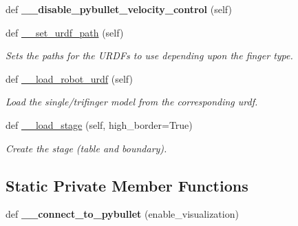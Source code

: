 \begin{DoxyCompactItemize}
def {\bfseries \+\_\+\+\_\+disable\+\_\+pybullet\+\_\+velocity\+\_\+control} (self)
\item 
\mbox{\label{classtrifinger__simulation_1_1sim__finger_1_1SimFinger_abc4c06d8b54077f9494ae9fd78014bee}} 
def \hyperlink{classtrifinger__simulation_1_1sim__finger_1_1SimFinger_abc4c06d8b54077f9494ae9fd78014bee}{\+\_\+\+\_\+set\+\_\+urdf\+\_\+path} (self)
\begin{DoxyCompactList}\small\item\em Sets the paths for the U\+R\+D\+Fs to use depending upon the finger type. \end{DoxyCompactList}\item 
\mbox{\label{classtrifinger__simulation_1_1sim__finger_1_1SimFinger_afb59a872dc92feaad5d292e69af4efd5}} 
def \hyperlink{classtrifinger__simulation_1_1sim__finger_1_1SimFinger_afb59a872dc92feaad5d292e69af4efd5}{\+\_\+\+\_\+load\+\_\+robot\+\_\+urdf} (self)
\begin{DoxyCompactList}\small\item\em Load the single/trifinger model from the corresponding urdf. \end{DoxyCompactList}\item 
def \hyperlink{classtrifinger__simulation_1_1sim__finger_1_1SimFinger_ae5b729d7973f90ad9511c4581d454a52}{\+\_\+\+\_\+load\+\_\+stage} (self, high\+\_\+border=True)
\begin{DoxyCompactList}\small\item\em Create the stage (table and boundary). \end{DoxyCompactList}\end{DoxyCompactItemize}
\subsection*{Static Private Member Functions}
\begin{DoxyCompactItemize}
\item 
\mbox{\label{classtrifinger__simulation_1_1sim__finger_1_1SimFinger_ae96f1cab7a32d2133b60fca99d2cb783}} 
def {\bfseries \+\_\+\+\_\+connect\+\_\+to\+\_\+pybullet} (enable\+\_\+visualization)
\end{DoxyCompactItemize}
